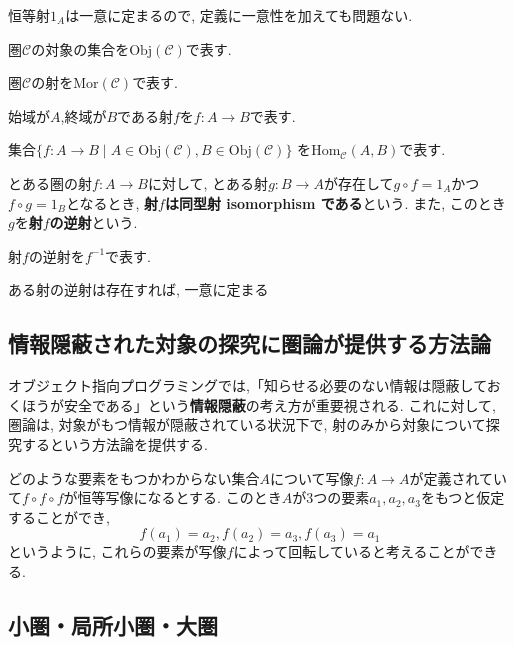 \begin{caution}
恒等射$1_{A}$は一意に定まるので, 定義に一意性を加えても問題ない.
\end{caution}
\begin{Notation}
圏$\mathscr{C}$の対象の集合を$\mathrm{Obj}(\mathscr{C})$で表す.
\end{Notation}
\begin{Notation}
圏$\mathscr{C}$の射を$\mathrm{Mor}(\mathscr{C})$で表す.
\end{Notation}

\begin{Notation}
始域が$A$,終域が$B$である射$f$を$f:A\rightarrow B$で表す.
\end{Notation}
\begin{Notation}
集合$\{f:A\rightarrow B\mid A\in\mathrm{Obj}(\mathscr{C}), B\in\mathrm{Obj}(\mathscr{C})\}$
を$\mathrm{Hom}_{\mathscr{C}}(A,B)$で表す.
\end{Notation}
\begin{Def}
とある圏の射$f:A\rightarrow B$に対して,
とある射$g:B\rightarrow A$が存在して$g\circ f=1_A$かつ$f\circ g=1_B$となるとき,
{\bf 射$f$は同型射 isomorphism である}という. また, このとき$g$を{\bf 射$f$の逆射}という.
\end{Def}
\begin{Notation}
射$f$の逆射を$f^{-1}$で表す.
\end{Notation}
\begin{Prop}
ある射の逆射は存在すれば, 一意に定まる
\end{Prop}
\subsection{情報隠蔽された対象の探究に圏論が提供する方法論}
オブジェクト指向プログラミングでは,「知らせる必要のない情報は隠蔽しておくほうが安全である」という{\bf 情報隠蔽}の考え方が重要視される.
これに対して, 圏論は, 対象がもつ情報が隠蔽されている状況下で, 射のみから対象について探究するという方法論を提供する.
\begin{example}
どのような要素をもつかわからない集合$A$について写像$f:A\rightarrow A$が定義されていて$f\circ f\circ f$が恒等写像になるとする.
このとき$A$が3つの要素$a_1,a_2,a_3$をもつと仮定することができ,
\[
f(a_1)=a_2, f(a_2)=a_3, 
f(a_3)=a_1
\]
というように, これらの要素が写像$f$によって回転していると考えることができる.
\end{example}
\subsection{小圏・局所小圏・大圏}
